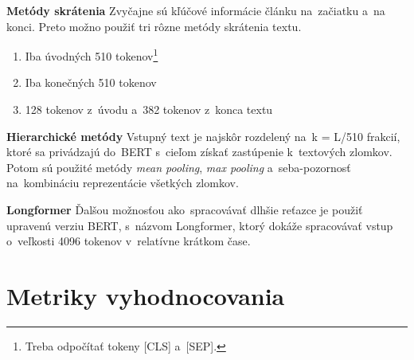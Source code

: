 \textbf{Metódy skrátenia} Zvyčajne sú kľúčové informácie článku na~začiatku a~na konci. Preto možno použiť tri rôzne metódy skrátenia textu.
\begin{enumerate}
    \item Iba úvodných 510 tokenov\footnote{Treba odpočítať tokeny [CLS] a~[SEP].}
    \item Iba konečných 510 tokenov
    \item 128 tokenov z~úvodu a~382 tokenov z~konca textu
\end{enumerate}

\textbf{Hierarchické metódy} Vstupný text je najskôr rozdelený na~k = L/510 frakcií, ktoré sa privádzajú do~BERT s~cieľom získať zastúpenie k~textových zlomkov. Potom sú použité metódy \textit{mean pooling}, \textit{max pooling} a~seba-pozornosť na~kombináciu reprezentácie všetkých zlomkov.\cite{Sun:2019}

\textbf{Longformer} \cite{Beltagy:2020} Ďalšou možnosťou ako~spracovávať dlhšie reťazce je použiť upravenú verziu BERT, s~názvom Longformer, ktorý dokáže spracovávať vstup o~veľkosti 4096 tokenov v~relatívne krátkom čase.


\section{Metriky vyhodnocovania} \label{metriky}

